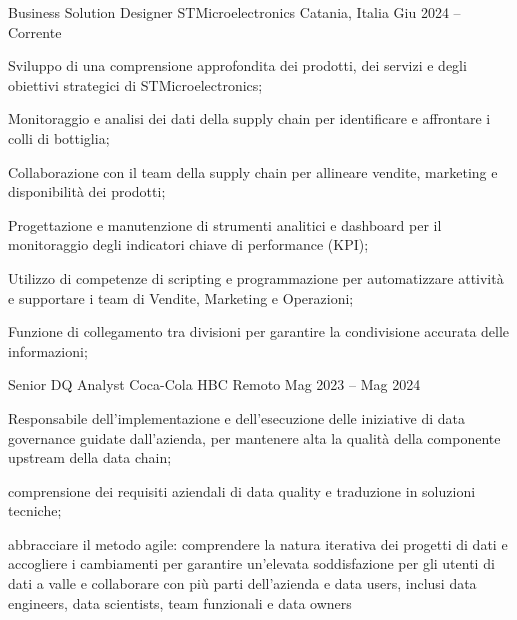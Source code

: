 
  \begin{cventries}
    \cventry
    {Business Solution Designer}
    {STMicroelectronics}
    {Catania, Italia}
    {Giu 2024 -- Corrente}
    {
      \begin{cvitems}
        \item {Sviluppo di una comprensione approfondita dei prodotti, dei servizi e degli obiettivi strategici di STMicroelectronics;}
        \item {Monitoraggio e analisi dei dati della supply chain per identificare e affrontare i colli di bottiglia;}
        \item {Collaborazione con il team della supply chain per allineare vendite, marketing e disponibilità dei prodotti;}
        \item {Progettazione e manutenzione di strumenti analitici e dashboard per il monitoraggio degli indicatori chiave di performance (KPI);}
        \item {Utilizzo di competenze di scripting e programmazione per automatizzare attività e supportare i team di Vendite, Marketing e Operazioni;}
        \item {Funzione di collegamento tra divisioni per garantire la condivisione accurata delle informazioni;}
      \end{cvitems}
    }
    

    \cventry
    {Senior DQ Analyst}
    {Coca-Cola HBC}
    {Remoto}
    {Mag 2023 -- Mag 2024}
    {
      \begin{cvitems}
        \item {Responsabile dell'implementazione e dell'esecuzione delle iniziative di data governance guidate dall'azienda,
        per mantenere alta la qualità della componente upstream della data chain;}
        \item{comprensione dei requisiti aziendali di data quality e traduzione in soluzioni tecniche;}
        \item{abbracciare il metodo agile: comprendere la natura iterativa dei progetti di dati e accogliere i cambiamenti per garantire un'elevata soddisfazione per gli utenti di dati a valle e collaborare con più parti dell'azienda e data users, inclusi data engineers, data scientists, team funzionali e data owners}
      \end{cvitems}
    }


\end{cventries}
